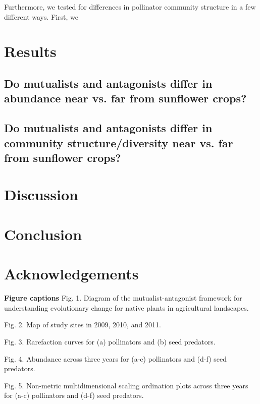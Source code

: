 \documentclass[12pt]{article}
\begin{document}
Furthermore, we tested for differences in pollinator community structure in a few different ways.  First, we 

\section{Results}
\subsection{Do mutualists and antagonists differ in abundance near vs. far from sunflower crops?}

\subsection{Do mutualists and antagonists differ in community structure/diversity near vs. far from sunflower crops?}


\section{Discussion}

\section{Conclusion}

\section{Acknowledgements}


\newpage 

 

\newpage 
\textbf{Figure captions}
Fig. 1.  Diagram of the mutualist-antagonist framework for understanding evolutionary change for native plants in agricultural landscapes.  

Fig. 2.  Map of study sites in 2009, 2010, and 2011.  

Fig. 3.  Rarefaction curves for (a) pollinators and (b) seed predators. 

Fig. 4.  Abundance across three years for (a-c) pollinators and (d-f) seed predators. 

Fig. 5.  Non-metric multidimensional scaling ordination plots across three years for (a-c) pollinators and (d-f) seed predators. 
\end{document}
